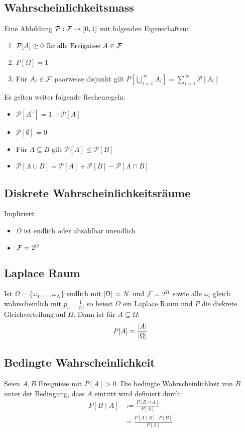 \subsection*{Wahrscheinlichkeitsmass}
Eine Abbildung $\mathcal{P}: \mathcal{F} \to [0, 1]$ mit folgenden Eigenschaften:
\begin{enumerate}[label= (\arabic*)]
  \item $\mathcal{P}[A] \geq 0 \text{ für alle Ereignisse } A \in \mathcal{F}$
  \item $P[\Omega] = 1$
  \item Für $A_i \in \mathcal{F}$ paarweise disjunkt gilt $P[\bigcup_{i = 1}^\infty A_i] =
          \sum_{i = 1}^\infty \mathcal{P}[A_i]$
\end{enumerate}
Es gelten weiter folgende Rechenregeln:
\begin{itemize}
  \item $\mathcal{P}[A^\complement] = 1 - \mathcal{P}[A]$
  \item $\mathcal{P}[\emptyset] = 0$
  \item Für $A \subseteq B$ gilt $\mathcal{P}[A] \leq \mathcal{P}[B]$
  \item $\mathcal{P}[A \cup B] = \mathcal{P}[A] + \mathcal{P}[B] - \mathcal{P}[A \cap B]$
\end{itemize}
\subsection*{Diskrete Wahrscheinlichkeitsräume}
Impliziert:
\begin{itemize}
  \item $\Omega$ ist endlich oder abzählbar unendlich
  \item $\mathcal{F} = 2^{\Omega}$
\end{itemize}
\subsection*{Laplace Raum}
Ist $\Omega = \{\omega_1, \dots, \omega_N\}$ endlich mit $\abs*{\Omega} = N$
und $\mathcal{F} = 2^\Omega$ sowie alle $\omega_i$ gleich wahrscheinlich mit $p_i =
  \frac{1}{n}$, so heisst $\Omega$ ein Laplace Raum und $P$ die diskrete
Gleichverteilung auf $\Omega$. Dann ist für $A \subseteq \Omega$:
\begin{align*}
  P[A] = \frac{\abs{A}}{\abs{\Omega}}
\end{align*}
\subsection*{Bedingte Wahrscheinlichkeit}
Seien $A, B$ Ereignisse mit $P[A] > 0$. Die bedingte Wahrscheinlichkeit von $B$
unter der Bedingung, dass $A$ eintritt wird definiert durch:
\begin{align*}
  P[B \;|\; A] & := \frac{P[B \cap A]}{P[A]}            \\
               & = \frac{P[A \;|\; B] \cdot P[B]}{P[A]}
\end{align*}
